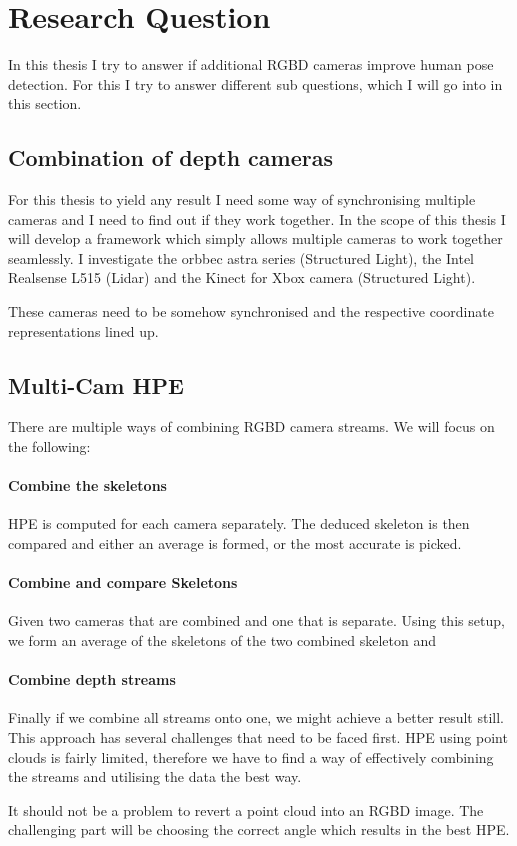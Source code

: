 \section{Research Question}

In this thesis I try to answer if additional RGBD cameras improve human pose detection. For this I try to answer different sub questions, which I will go into in this section.

\subsection{Combination of depth cameras}

For this thesis to yield any result I need some way of synchronising multiple cameras and I need to find out if they work together. In the scope of this thesis I will develop a framework which simply allows multiple cameras to work together seamlessly. I investigate the orbbec astra series (Structured Light), the Intel Realsense L515 (Lidar) and the Kinect for Xbox camera (Structured Light).

These cameras need to be somehow synchronised and the respective coordinate representations lined up.

\subsection{Multi-Cam HPE}

There are multiple ways of combining RGBD camera streams. We will focus on the following:

\paragraph{Combine the skeletons}

HPE is computed for each camera separately. The deduced skeleton is then compared and either an average is formed, or the most accurate is picked.

\paragraph{Combine and compare Skeletons}

Given two cameras that are combined and one that is separate. Using this setup, we form an average of the skeletons of the two combined skeleton and 

\paragraph{Combine depth streams}

Finally if we combine all streams onto one, we might achieve a better result still. This approach has several challenges that need to be faced first. HPE using point clouds is fairly limited, therefore we have to find a way of effectively combining the streams and utilising the data the best way.

It should not be a problem to revert a point cloud into an RGBD image. The challenging part will be choosing the correct angle which results in the best HPE.